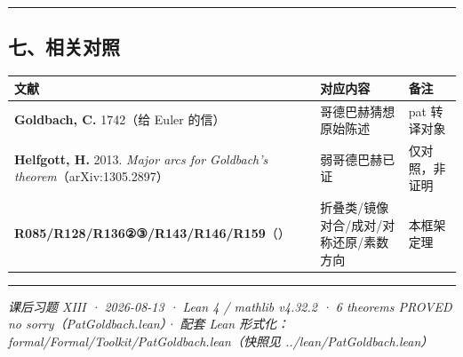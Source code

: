 \documentclass[
]{article}
\newcounter{none} %
\begin{document}
\begin{center}\rule{0.5\linewidth}{0.5pt}\end{center}

\subsection{七、相关对照}\label{ux4e03ux76f8ux5173ux5bf9ux7167}

{\def\LTcaptype{none} %
\begin{longtable}[]{@{}
 >{\raggedright\arraybackslash}p{}
 >{\raggedright\arraybackslash}p{}
 >{\raggedright\arraybackslash}p{}@{}}
\toprule\noalign{}
\begin{minipage}[b]{\linewidth}\raggedright
文献
\end{minipage} & \begin{minipage}[b]{\linewidth}\raggedright
对应内容
\end{minipage} & \begin{minipage}[b]{\linewidth}\raggedright
备注
\end{minipage} \\
\midrule\noalign{}
\endhead
\bottomrule\noalign{}
\endlastfoot
\textbf{Goldbach, C.} 1742（给 Euler 的信） & 哥德巴赫猜想原始陈述 & pat
转译对象 \\
\textbf{Helfgott, H.} 2013. \emph{Major arcs for Goldbach's
theorem}（arXiv:1305.2897） & 弱哥德巴赫已证 & 仅对照，非证明 \\
\textbf{R085/R128/R136②③/R143/R146/R159}（） &
折叠类/镜像对合/成对/对称还原/素数方向 & 本框架定理 \\
\end{longtable}
}

\begin{center}\rule{0.5\linewidth}{0.5pt}\end{center}

\emph{课后习题 XIII · 2026-08-13 · Lean 4 / mathlib v4.32.2 · 6
theorems PROVED no sorry（PatGoldbach.lean）· 配套 Lean
形式化：formal/Formal/Toolkit/PatGoldbach.lean（快照见
../lean/PatGoldbach.lean）}
\end{document}
